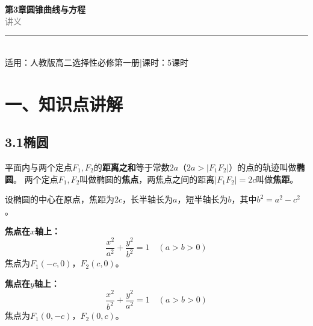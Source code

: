 \documentclass[12pt, a4paper]{ctexart}
\begin{document}
\begin{center}
{\Huge\bfseries\textcolor{mainblue}{第3章\quad 圆锥曲线与方程}}\\[12pt]
{\Large\textcolor{gray}{讲\quad 义}}\\[8pt]
\rule{0.6\textwidth}{1pt}\\[8pt]
{\normalsize 适用：人教版\quad 高二选择性必修第一册\quad |\quad 课时：5课时}
\end{center}
\vspace{10pt}

\section*{\textcolor{mainblue}{一、知识点讲解}}

\subsection*{3.1\quad 椭圆}

\begin{knowledgebox}[定义]
平面内与两个定点$F_1, F_2$的\textbf{距离之和}等于常数$2a$（$2a > |F_1F_2|$）的点的轨迹叫做\textbf{椭圆}。
两个定点$F_1, F_2$叫做椭圆的\textbf{焦点}，两焦点之间的距离$|F_1F_2|=2c$叫做\textbf{焦距}。
\end{knowledgebox}

\vspace{4pt}

\begin{knowledgebox}[标准方程]
设椭圆的中心在原点，焦距为$2c$，长半轴长为$a$，短半轴长为$b$，其中$b^2 = a^2 - c^2$。

\textbf{焦点在$x$轴上：}
\[\frac{x^2}{a^2} + \frac{y^2}{b^2} = 1 \quad (a > b > 0)\]
焦点为$F_1(-c, 0)$，$F_2(c, 0)$。

\textbf{焦点在$y$轴上：}
\[\frac{x^2}{b^2} + \frac{y^2}{a^2} = 1 \quad (a > b > 0)\]
焦点为$F_1(0, -c)$，$F_2(0, c)$。
\end{knowledgebox}
\end{document}
